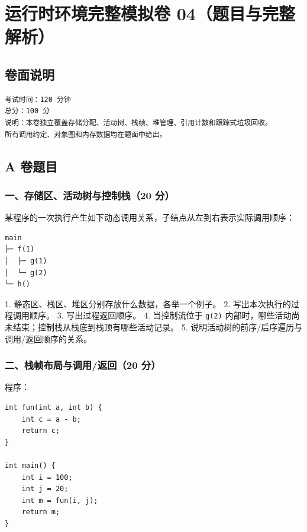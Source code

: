 \documentclass[UTF8]{ctexart}
\begin{document}
\section*{运行时环境完整模拟卷 04（题目与完整解析）}

\subsection*{卷面说明}

\begin{Verbatim}[fontsize=\small,breaklines=true]
考试时间：120 分钟
总分：100 分
说明：本卷独立覆盖存储分配、活动树、栈帧、堆管理、引用计数和跟踪式垃圾回收。
所有调用约定、对象图和内存数据均在题面中给出。
\end{Verbatim}

\subsection*{A 卷题目}

\subsubsection*{一、存储区、活动树与控制栈（20 分）}

某程序的一次执行产生如下动态调用关系，子结点从左到右表示实际调用顺序：

\begin{Verbatim}[fontsize=\small,breaklines=true]
main
├─ f(1)
│  ├─ g(1)
│  └─ g(2)
└─ h()
\end{Verbatim}

1. 静态区、栈区、堆区分别存放什么数据，各举一个例子。 2. 写出本次执行的过程调用顺序。 3. 写出过程返回顺序。 4. 当控制流位于 \texttt{g(2)} 内部时，哪些活动尚未结束；控制栈从栈底到栈顶有哪些活动记录。 5. 说明活动树的前序/后序遍历与调用/返回顺序的关系。

\subsubsection*{二、栈帧布局与调用/返回（20 分）}

程序：

\begin{Verbatim}[fontsize=\small,breaklines=true]
int fun(int a, int b) {
    int c = a - b;
    return c;
}

int main() {
    int i = 100;
    int j = 20;
    int m = fun(i, j);
    return m;
}
\end{Verbatim}
\end{document}

